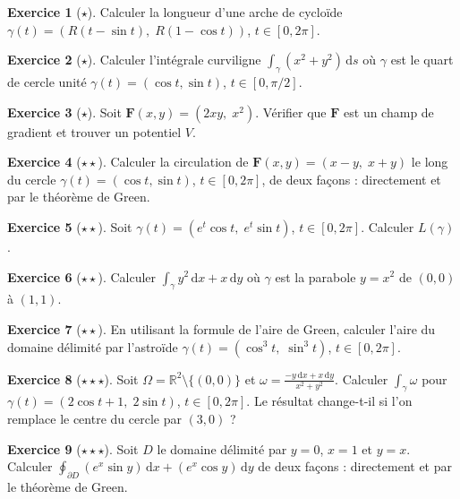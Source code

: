 \documentclass[12pt,a4paper,openany]{book}
\theoremstyle{definition}
\newtheorem{exercice}{Exercice}[chapter]
\newcommand{\R}{\mathbb{R}}
\newcommand{\dd}{\mathrm{d}}
\begin{document}
\begin{exercice}[$\star$]
  Calculer la longueur d'une arche de cycloïde
  $\gamma(t) = (R(t-\sin t),\; R(1-\cos t))$, $t \in [0,2\pi]$.
\end{exercice}

\begin{exercice}[$\star$]
  Calculer l'intégrale curviligne $\int_\gamma(x^2+y^2)\,\dd s$ où
  $\gamma$ est le quart de cercle unité $\gamma(t) = (\cos t,\sin t)$,
  $t \in [0,\pi/2]$.
\end{exercice}

\begin{exercice}[$\star$]
  Soit $\mathbf{F}(x,y) = (2xy,\; x^2)$. Vérifier que $\mathbf{F}$
  est un champ de gradient et trouver un potentiel $V$.
\end{exercice}

\begin{exercice}[$\star\star$]
  Calculer la circulation de $\mathbf{F}(x,y) = (x-y,\; x+y)$ le long
  du cercle $\gamma(t) = (\cos t,\sin t)$, $t \in [0,2\pi]$, de deux
  façons : directement et par le théorème de Green.
\end{exercice}

\begin{exercice}[$\star\star$]
  Soit $\gamma(t) = (e^t\cos t,\; e^t\sin t)$, $t \in [0,2\pi]$.
  Calculer $L(\gamma)$.
\end{exercice}

\begin{exercice}[$\star\star$]
  Calculer $\displaystyle\int_\gamma y^2\,\dd x + x\,\dd y$ où
  $\gamma$ est la parabole $y = x^2$ de $(0,0)$ à $(1,1)$.
\end{exercice}

\begin{exercice}[$\star\star$]
  En utilisant la formule de l'aire de Green, calculer l'aire du domaine
  délimité par l'astroïde
  $\gamma(t) = (\cos^3 t,\; \sin^3 t)$, $t \in [0,2\pi]$.
\end{exercice}

\begin{exercice}[$\star\star\star$]
  Soit $\Omega = \R^2\setminus\{(0,0)\}$ et
  $\omega = \frac{-y\,\dd x + x\,\dd y}{x^2+y^2}$. Calculer
  $\int_\gamma\omega$ pour $\gamma(t) = (2\cos t + 1,\; 2\sin t)$,
  $t \in [0,2\pi]$. Le résultat change-t-il si l'on remplace le centre
  du cercle par $(3,0)$ ?
\end{exercice}

\begin{exercice}[$\star\star\star$]
  Soit $D$ le domaine délimité par $y = 0$, $x = 1$ et $y = x$.
  Calculer $\oint_{\partial D}(e^x\sin y)\,\dd x + (e^x\cos y)\,\dd y$
  de deux façons : directement et par le théorème de Green.
\end{exercice}
\end{document}
